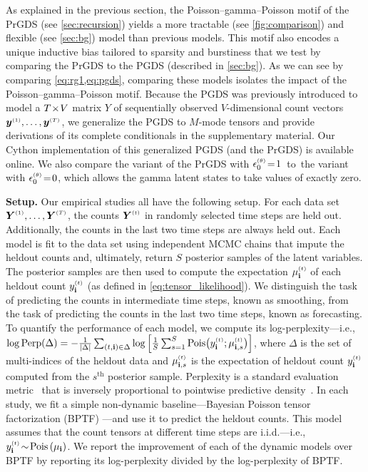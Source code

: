 \documentclass{article}
\begin{document}
As explained in the previous section, the Poisson--gamma--Poisson motif of the PrGDS (see \cref{sec:recursion}) yields a more tractable (see \cref{fig:comparison}) and flexible (see \cref{sec:bg}) model than previous models. This motif also encodes a unique inductive bias tailored to sparsity and burstiness that we test by comparing the PrGDS to the PGDS (described in \cref{sec:bg}). As we can see by comparing \cref{eq:rg1,eq:pgds}, comparing these models isolates the impact of the Poisson--gamma--Poisson motif. Because the PGDS was previously introduced to model a $T \!\times\! V$ matrix $Y$ of sequentially observed $V$-dimensional count vectors $\boldsymbol{y}^{\mathsmaller{(1)}},\dots, \boldsymbol{y}^{\mathsmaller{(T)}}$, we generalize the PGDS to $M$-mode tensors and provide derivations of its complete conditionals in the supplementary material. Our Cython implementation of this generalized PGDS (and the PrGDS) is available online. We also compare the variant of the PrGDS with $\epstheta \teq 1$~to~the variant with $\epstheta \teq 0$, which allows the gamma latent states to take values of exactly zero.

\textbf{Setup.} Our empirical studies all have the following setup. For each data set $\Yten^{\mathsmaller{(1)}},\dots,\Yten^{\mathsmaller{(T)}}$, the counts $\Yten^{\mathsmaller{(t)}}$ in randomly selected time steps are held out. Additionally, the counts in the last two time steps are always held out. Each model is fit to the data set using independent MCMC chains that impute the heldout counts and, ultimately, return $S$ posterior samples of the latent variables. The posterior samples are then used to compute the expectation $\mudt$ of each heldout count $\ydt$ (as defined in \cref{eq:tensor_likelihood}). We distinguish the task of predicting the counts in intermediate time steps, known as smoothing, from the task of predicting the counts in the last two time steps, known as forecasting.
%
To quantify the performance of each model, we compute its log-perplexity---i.e., $\log \textrm{Perp}(\Delta) = -\frac{1}{|\Delta|}\sum_{(t,\osubs) \in \Delta} \log \Big[\frac{1}{S}\sum_{s=1}^S \textrm{Pois}\big(\ydt; \musdt \big) \Big]$, where $\Delta$ is the set of multi-indices of the heldout data and $\musdt$ is the expectation of heldout count $\ydt$ computed from the $s^{\textrm{th}}$ posterior sample.
%
Perplexity is a standard evaluation metric~\citep{wallach2009evaluation} that is inversely proportional to pointwise predictive density~\citep{gelman2014understanding}.
%
In each study, we fit a simple non-dynamic baseline---Bayesian Poisson tensor factorization (BPTF) \cite{schein2015bayesian}---and use it to predict the heldout counts. This model assumes that the count tensors at different time steps are i.i.d.---i.e., $y_{\osubs}^{\mathsmaller{(t)}} \tsim \Pois{\mud}$. We report the improvement of each of the dynamic models over BPTF by reporting its log-perplexity divided by the log-perplexity of BPTF.
\end{document}
